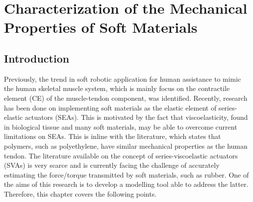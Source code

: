 \chapter{Characterization of the Mechanical Properties of Soft Materials} \label{ch:characterizationSoft}




\section{Introduction}

Previously, the trend in soft robotic application for human assistance to mimic the human skeletal muscle system, which is mainly focus on the contractile element (CE) of the muscle-tendon component, was identified. Recently, research has been done on implementing soft materials as the elastic element of series-elastic actuators (SEAs). This is motivated by the fact that viscoelasticity, found in biological tissue and many soft materials, may be able to overcome current limitations on SEAs. This is inline with the literature, which states that polymers, such as polyethylene, have similar mechanical properties as the human tendon. The literature available on the concept of series-viscoelastic actuators (SVAs) is very scarce and is currently facing the challenge of accurately estimating the force/torque transmitted by soft materials, such as rubber. One of the aims of this research is to develop a modelling tool able to address the latter. Therefore, this chapter covers the following points.

